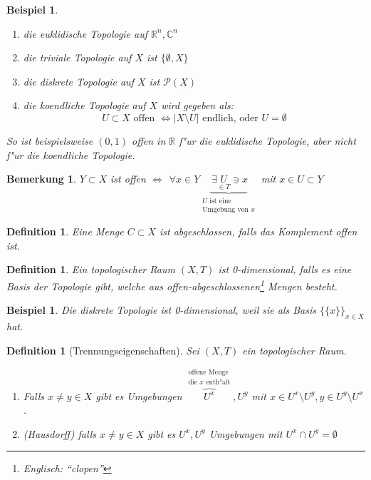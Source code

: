 \documentclass[a4paper,12pt,numbers=noenddot,parskip=full]{scrartcl}
\newcommand{\setR}{\mathbb{R}}
\newcommand{\setC}{\mathbb{C}}
\newcommand{\Forall}{~\forall}
\newcommand{\Exists}{~\exists}
\newcommand{\scrP}{\mathcal{P}}
\theoremstyle{dotless}
\newtheorem{definition}[theorem]{Definition}
\newtheorem{example}[theorem]{Beispiel}
\newtheorem{remark}[theorem]{Bemerkung}
\begin{document}
\begin{example}
	\begin{enumerate}
		\item die euklidische Topologie auf $\setR^n, \setC^n$
		\item die triviale Topologie auf $X$ ist $\{\emptyset, X \}$
		\item die diskrete Topologie auf $X$ ist $\scrP(X)$
		\item die koendliche Topologie auf $X$ wird gegeben als: 
		\begin{equation*}
			U \subset X \text{ offen } \Longleftrightarrow |X \setminus U| \text{ endlich, oder } U = \emptyset
		\end{equation*}
	\end{enumerate}
	So ist beispielsweise $(0,1)$ offen in $\setR$ f"ur die euklidische Topologie, aber nicht f"ur die koendliche Topologie.
\end{example}
\begin{remark}
	$Y \subset X$ ist offen $\Longleftrightarrow~ \Forall x \in Y \underbrace{\Exists \underset{\in T}{U} \ni x}_{\substack{U \text{ ist eine}\\ \text{Umgebung von } x}}$ mit $x \in U \subset Y$
\end{remark}
\begin{definition}
	Eine Menge $C \subset X$ ist \emph{abgeschlossen}, falls das Komplement offen ist.
\end{definition}
\begin{definition}
	Ein topologischer Raum $(X,T)$ ist \emph{0-dimensional}, falls es eine Basis der Topologie gibt, welche aus offen-abgeschlossenen\footnote{Englisch: "`clopen"'} Mengen besteht.
\end{definition}
\begin{example}
	Die diskrete Topologie ist \emph{0-dimensional}, weil sie als Basis $\{\{x\} \}_{x \in X}$ hat.
\end{example}
\begin{definition}[Trennungseigenschaften]
	Sei $(X, T)$ ein topologischer Raum.
	\begin{enumerate}
		\item[T1] \label{T1} Falls $x \neq y \in X$ gibt es Umgebungen $\overbrace{U^x}^{\substack{\text{offene Menge}\\ \text{die } x \text{ enth"alt}}}, U^y$ mit $x \in U^x \setminus U^y, y \in U^y \setminus U^x$.
		\item[T2] \label{T2} (Hausdorff) falls $x \neq y \in X$ gibt es $U^x, U^y$ Umgebungen mit $U^x \cap U^y = \emptyset$
	\end{enumerate}
\end{definition}
\end{document}
